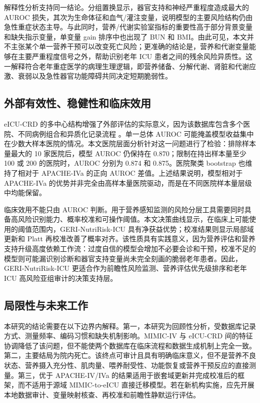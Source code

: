 \documentclass[11pt]{ctexart}
\begin{document}
解释性分析支持同一结论。分组置换显示，器官支持和神经严重程度造成最大的 AUROC 损失，其次为生命体征和血气/灌注变量，说明模型的主要风险结构仍由急性重症状态主导。与此同时，营养/代谢实验室指标的重要性高于部分背景变量和缺失指示变量，单变量 gain 排序中也出现了 BUN 和 BMI。由此可见，本文并不主张某个单一营养干预可以改变死亡风险；更准确的结论是，营养和代谢变量能够在主要严重程度信号之外，帮助识别老年 ICU 患者之间的残余风险异质性。这一解释符合老年重症医学的病理生理逻辑，即营养储备、分解代谢、肾脏和代谢应激、衰弱以及急性器官功能障碍共同决定短期脆弱性。

\subsection{外部有效性、稳健性和临床效用}
eICU-CRD 的多中心结构增强了外部评估的实际意义，因为该数据库包含多个医院、不同病例组合和异质化记录流程 \citep{Pollard2018EICU}。单一总体 AUROC 可能掩盖模型收益集中在少数大样本医院的情况。本文医院层面分析针对这一问题进行了检验：排除样本量最大的 10 家医院后，模型 AUROC 仍保持在 0.870；限制在持出样本量至少 100 或 200 的医院时，AUROC 分别为 0.874 和 0.875。医院聚类 bootstrap 也维持了相对于 APACHE-IVa 的正向 AUROC 差值。上述结果说明，模型相对于 APACHE-IVa 的优势并非完全由高样本量医院驱动，而是在不同医院样本量层级中均能保留。

临床效用不能只由 AUROC 判断。用于营养感知监测的风险分层工具需要同时具备高风险识别能力、概率校准和可操作阈值。本文决策曲线显示，在临床上可能使用的阈值范围内，GERI-NutriRisk-ICU 具有净获益优势；校准结果则显示局部域更新和 Platt 再校准改善了概率对齐。该性质具有实践意义，因为营养评估和营养支持升级高度依赖工作流：过度自信的模型会增加不必要会诊和干预，校准不足的模型则可能漏识别诊断和器官支持变量尚未完全刻画的脆弱老年患者。因此，GERI-NutriRisk-ICU 更适合作为前瞻性风险监测、营养评估优先级排序和老年 ICU 高风险亚组审计的决策支持层。

\subsection{局限性与未来工作}
本研究的结论需要在以下边界内解释。第一，本研究为回顾性分析，受数据库记录方式、测量频率、编码习惯和缺失机制影响。MIMIC-IV 与 eICU-CRD 间的特征协调降低了该问题，但不能使两个数据库在临床流程和数据生成机制上完全一致。第二，主要结局为院内死亡。该终点可审计且具有明确临床意义，但不是营养不良状态、营养摄入充分性、肌肉量、喂养耐受性、功能恢复或营养干预反应的直接测量。第三，优于 APACHE-IV/IVa 的结果适用于嵌套域更新并完成校准后的框架，而不适用于源域 MIMIC-to-eICU 直接迁移模型。若在新机构实施，应先开展本地数据审计、变量映射核查、再校准和前瞻性静默运行评估。
\end{document}
